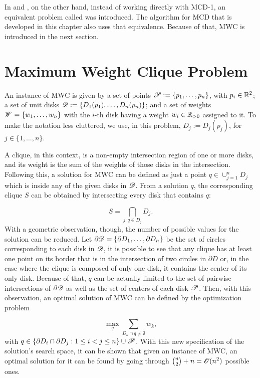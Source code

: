 In  and , on the other hand, instead of working directly with MCD-1, an equivalent problem called  was introduced. The algorithm for MCD that is developed in this chapter also uses that equivalence. Because of that, MWC is introduced in the next section.

\section{Maximum Weight Clique Problem}

An instance of MWC is given by a set of points $\mathscr{P}:=\{p_1,\dots,p_n\}$, with $p_i \in \mathbb{R}^2$; a set of unit disks $\mathscr{D}:=\{D_1(p_1),\dots,D_n(p_n)\}$; and a set of weights $\mathscr{W}=\{w_1, \dots, w_n\}$ with the $i$-th disk having a weight $w_i\in \mathbb{R}_{>0}$ assigned to it. To make the notation less cluttered, we use, in this problem, $D_j:=D_j(p_j)$, for $j\in\{1, \dots, n\}$.

A clique, in this context, is a non-empty intersection region of one or more disks, and its weight is the sum of the weights of those disks in the intersection.
Following this, a solution for MWC can be defined as just a point $q\in\cup_{j=1}^n D_j$ which is inside any of the given disks in $\mathscr{D}$.
From a solution $q$, the corresponding clique $S$ can be obtained by intersecting every disk that contains $q$:

\begin{equation}
S = \bigcap_{j : q \in D_j} D_j.
\end{equation}
With a geometric observation, though, the number of possible values for the solution can be reduced.
Let $\partial \mathscr{D} = \{ \partial D_1, \dots, \partial D_n \}$ be the set of circles corresponding to each disk in $\mathscr{D}$, it is possible to see that any clique has at least one point on its border that is in the intersection of two circles in $\partial D$ or, in the case where the clique is composed of only one disk, it contains the center of its only disk. Because of that, $q$ can be actually limited to the set of pairwise intersections of $\partial \mathscr{D}$ as well as the set of centers of each disk $\mathscr{P}$. Then, with this observation, an optimal solution of MWC can be defined by the optimization problem

\begin{equation}
\max_{q} \sum_{D_k \cap q \neq \emptyset} w_k,
\end{equation}
with $q \in \{\partial D_i \cap \partial D_j : 1 \le i < j \le n\} \cup \mathscr{P}$. With this new specification of the solution's search space, it can be shown that given an instance of MWC, an optimal solution for it can be found by going through $\binom{n}{2} + n = \mathscr{O}(n^2)$ possible ones.

